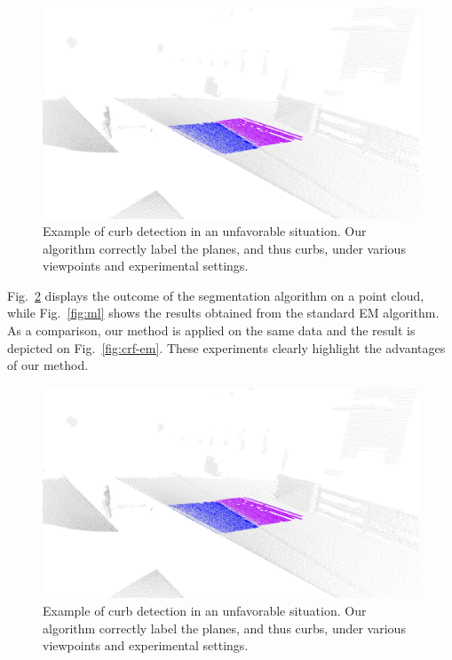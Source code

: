 \begin{figure}[t]
\centering
\includegraphics[width=\columnwidth]{fig/special.eps}
\caption{Example of curb detection in an unfavorable situation. Our algorithm
correctly label the planes, and thus curbs, under various viewpoints and
experimental settings.}
\label{fig:special}
\end{figure}

Fig.~\ref{fig:segment} displays the outcome of the segmentation algorithm on a
point cloud, while Fig.~\ref{fig:ml} shows the results obtained from the
standard EM algorithm. As a comparison, our method is applied on the same data
and the result is depicted on Fig.~\ref{fig:crf-em}. These experiments clearly
highlight the advantages of our method.

\begin{figure}[t]
\centering
\includegraphics[width=\columnwidth]{fig/special.eps}
\caption{Example of curb detection in an unfavorable situation. Our algorithm
correctly label the planes, and thus curbs, under various viewpoints and
experimental settings.}
\label{fig:segment}
\end{figure}

